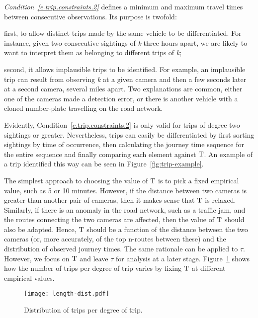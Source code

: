 \textit{Condition~\ref{e.trip.constraints.2}} defines a minimum and maximum travel times between consecutive observations. Its purpose is twofold:
\begin{enumerate*}[label=(\roman*)]
  \item first, to allow distinct trips made by the same vehicle to be differentiated. For instance, given two consecutive sightings of \emph{k} three hours apart, we are likely to want to interpret them as belonging to different trips of \emph{k};
  \item second, it allows implausible trips to be identified. For example, an implausible trip can result from observing \emph{k} at a given camera and then a few seconds later at a second camera, several miles apart. Two explanations are common, either one of the cameras made a detection error, or there is another vehicle with a cloned number-plate travelling on the road network.
\end{enumerate*} Evidently, Condition~\ref{e.trip.constraints.2} is only valid for trips of degree two sightings or greater. Nevertheless, trips can easily be differentiated by first sorting sightings by time of occurrence, then calculating the journey time sequence for the entire sequence and finally comparing each element against $\mathrm{T}$. An example of a trip identified this way can be seen in Figure~\ref{fig:trip-example}.

The simplest approach to choosing the value of $\mathrm{T}$ is to pick a fixed empirical value, such as 5 or 10 minutes. However, if the distance between two cameras is greater than another pair of cameras, then it makes sense that $\mathrm{T}$ is relaxed. Similarly, if there is an anomaly in the road network, such as a traffic jam, and the routes connecting the two cameras are affected, then the value of $\mathrm{T}$ should also be adapted. Hence, $\mathrm{T}$ should be a function of the distance between the two cameras (or, more accurately, of the top n-routes between these) and the distribution of observed journey times. The same rationale can be applied to $\tau$. However, we focus on $\mathrm{T}$ and leave $\tau$ for analysis at a later stage. Figure~\ref{fig:length-dist} shows how the number of trips per degree of trip varies by fixing $\mathrm{T}$ at different empirical values.

\begin{figure}[t]
  \centering
  \texttt{[image: length-dist.pdf]}
  \caption{Distribution of trips per degree of trip.}
  \label{fig:length-dist}
\end{figure}

